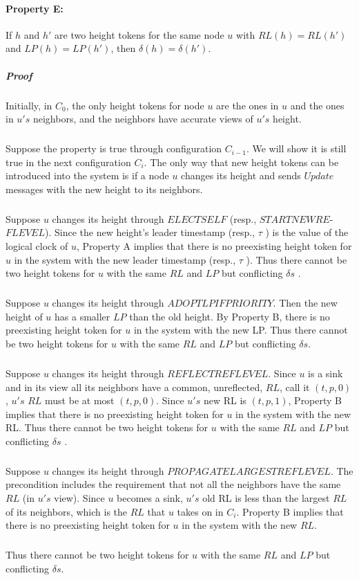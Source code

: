 \paragraph{Property E:}If $h$ and $h'$ are two height tokens for the same node $u$ with $RL(h) = RL(h')$ and $LP(h) = LP(h')$, then $\delta (h) = \delta (h' )$.
\subparagraph{Proof}Initially, in $C_0$, the only height tokens for node $u$ are the ones in $u$ and the ones in $u's$ neighbors, and the neighbors have accurate views of $u's$ height.
\subparagraph{}Suppose the property is true through configuration $C_{i-1}$. We will show it is still true in the next configuration $C_i$. The only way that new height tokens can be introduced into the system is if a node $u$ changes its height and sends $Update$ messages with the new height to its neighbors.
\subparagraph{}Suppose $u$ changes its height through $ELECTSELF$ (resp., $STARTNEWRE$-$FLEVEL$). Since the new height's leader timestamp (resp., $\tau$ ) is the value of the logical clock of $u$, Property A implies that there is no preexisting height token for $u$ in the system with the new leader timestamp (resp., $\tau$ ). Thus there cannot be two height tokens for $u$ with the same $RL$ and $LP$ but conflicting $\delta s$ .
\subparagraph{}Suppose $u$ changes its height through $ADOPTLPIFPRIORITY$. Then the new height of $u$ has a smaller $LP$ than the old height. By Property B, there is no preexisting height token for $u$ in the system with the new LP. Thus there cannot be two height tokens for $u$ with the same $RL$ and $LP$ but conflicting $\delta s$.
\subparagraph{}Suppose $u$ changes its height through $REFLECTREFLEVEL$. Since $u$ is a sink and in its view all its neighbors have a common, unreflected, $RL$, call it $(t, p, 0)$, $u's$ $RL$ must be at most $(t, p, 0)$. Since $u's$ new RL is $(t, p, 1)$, Property B implies that there is no preexisting height token for $u$ in the system with the new RL. Thus there cannot be two height tokens for $u$ with the same $RL$ and $LP$ but conflicting $\delta s$ . 
\subparagraph{}Suppose $u$ changes its height through $PROPAGATELARGESTREFLEVEL$. The precondition includes the requirement that not all the neighbors have the same $RL$ (in $u's$ view). Since $u$ becomes a sink, $u's$ old RL is less than the largest $RL$ of its neighbors, which is the $RL$ that $u$ takes on in $C_i$. Property B implies that there is no preexisting height token for $u$ in the system with the new $RL$. 
\subparagraph{}Thus there cannot be two height tokens for $u$ with the same $RL$ and $LP$ but conflicting $\delta s$.

